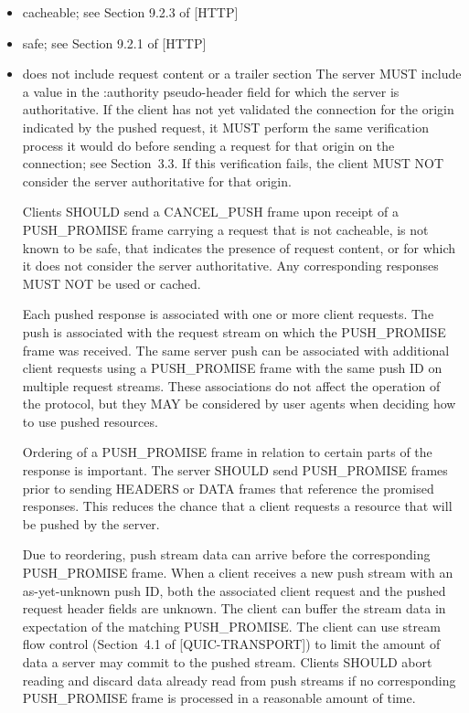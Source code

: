 \documentclass{article}
\begin{document}
\begin{itemize}
\item cacheable; see Section 9.2.3 of [HTTP]
\item safe; see Section 9.2.1 of [HTTP]
\item does not include request content or a trailer section
The server MUST include a value in the :authority pseudo-header field for which the server is authoritative.  If the client has not yet validated the connection for the origin indicated by the pushed request, it MUST perform the same verification process it would do before sending a request for that origin on the connection; see Section~3.3.  If this verification fails, the client MUST NOT consider the server authoritative for that origin.

Clients SHOULD send a CANCEL\_PUSH frame upon receipt of a PUSH\_PROMISE frame carrying a request that is not cacheable, is not known to be safe, that indicates the presence of request content, or for which it does not consider the server authoritative.  Any corresponding responses MUST NOT be used or cached.

Each pushed response is associated with one or more client requests. The push is associated with the request stream on which the PUSH\_PROMISE frame was received.  The same server push can be associated with additional client requests using a PUSH\_PROMISE frame with the same push ID on multiple request streams.  These associations do not affect the operation of the protocol, but they MAY be considered by user agents when deciding how to use pushed resources.

Ordering of a PUSH\_PROMISE frame in relation to certain parts of the response is important.  The server SHOULD send PUSH\_PROMISE frames prior to sending HEADERS or DATA frames that reference the promised responses.  This reduces the chance that a client requests a resource that will be pushed by the server.

Due to reordering, push stream data can arrive before the corresponding PUSH\_PROMISE frame.  When a client receives a new push stream with an as-yet-unknown push ID, both the associated client request and the pushed request header fields are unknown.  The client can buffer the stream data in expectation of the matching PUSH\_PROMISE.  The client can use stream flow control (Section~4.1 of [QUIC-TRANSPORT]) to limit the amount of data a server may commit to the pushed stream.  Clients SHOULD abort reading and discard data already read from push streams if no corresponding PUSH\_PROMISE frame is processed in a reasonable amount of time.


\end{itemize}
\end{document}
